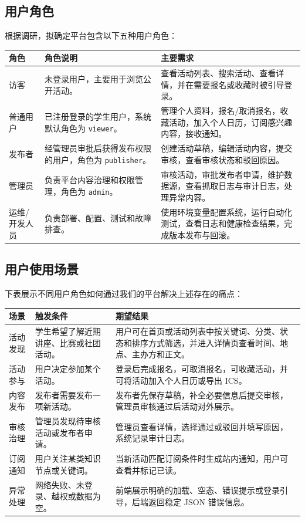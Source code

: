 \documentclass[12pt,a4paper]{ctexart}
\begin{document}
  \subsection{用户角色}
  根据调研，拟确定平台包含以下五种用户角色：\par
  \noindent\begin{tabularx}{\textwidth}{p{2.4cm}Y Y}
  \toprule 角色 & 角色说明 & 主要需求 \\\midrule
  访客 & 未登录用户，主要用于浏览公开活动。 & 查看活动列表、搜索活动、查看详情，并在需要报名或收藏时被引导登录。 \\
  普通用户 & 已注册登录的学生用户，系统默认角色为 \texttt{viewer}。 & 管理个人资料，报名/取消报名，收藏活动，加入个人日历，订阅感兴趣内容，接收通知。 \\
  发布者 & 经管理员审批后获得发布权限的用户，角色为 \texttt{publisher}。 & 创建活动草稿，编辑活动内容，提交审核，查看审核状态和驳回原因。 \\
  管理员 & 负责平台内容治理和权限管理，角色为 \texttt{admin}。 & 审核活动，审批发布者申请，维护数据源，查看抓取日志与审计日志，处理异常内容。 \\
  运维/开发人员 & 负责部署、配置、测试和故障排查。 & 使用环境变量配置系统，运行自动化测试，查看日志和健康检查结果，完成版本发布与回滚。 \\
  \bottomrule
  \end{tabularx}

  \subsection{用户使用场景}
  下表展示不同用户角色如何通过我们的平台解决上述存在的痛点：

  \begin{longtable}{p{2.2cm}p{3.2cm}p{6.8cm}}
  \toprule 场景 & 触发条件 & 期望结果 \\\midrule\endhead
  活动发现 & 学生希望了解近期讲座、比赛或社团活动。 & 用户可在首页或活动列表中按关键词、分类、状态和排序方式筛选，并进入详情页查看时间、地点、主办方和正文。 \\
  活动参与 & 用户决定参加某个活动。 & 登录后完成报名，可取消报名，可收藏活动，并可将活动加入个人日历或导出 ICS。 \\
  内容发布 & 发布者需要发布一项新活动。 & 发布者先保存草稿，补全必要信息后提交审核，管理员审核通过后活动对外展示。 \\
  审核治理 & 管理员发现待审核活动或发布者申请。 & 管理员查看详情，选择通过或驳回并填写原因，系统记录审计日志。 \\
  订阅通知 & 用户关注某类知识节点或关键词。 & 当新活动匹配订阅条件时生成站内通知，用户可查看并标记已读。 \\
  异常处理 & 网络失败、未登录、越权或数据为空。 & 前端展示明确的加载、空态、错误提示或登录引导，后端返回稳定 JSON 错误信息。 \\
  \bottomrule
  \end{longtable}
\end{document}

